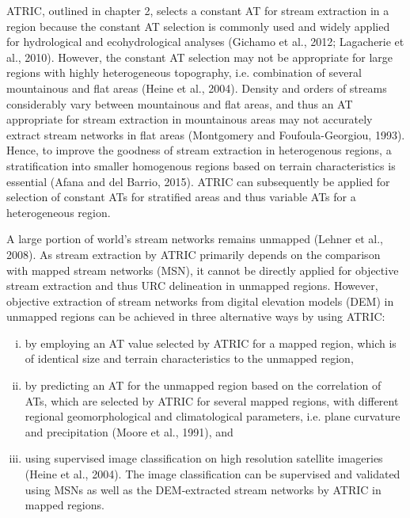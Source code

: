 ATRIC, outlined in chapter 2, selects a constant AT for stream extraction in a region because the constant AT selection is commonly used and widely applied for hydrological and ecohydrological analyses (Gichamo et al., 2012; Lagacherie et al., 2010). However, the constant AT selection may not be appropriate for large regions with highly heterogeneous topography, i.e. combination of several mountainous and flat areas (Heine et al., 2004). Density and orders of streams considerably vary between mountainous and flat areas, and thus an AT appropriate for stream extraction in mountainous areas may not accurately extract stream networks in flat areas (Montgomery and Foufoula-Georgiou, 1993). Hence, to improve the goodness of stream extraction in heterogenous regions, a stratification into smaller homogenous regions based on terrain characteristics is essential (Afana and del Barrio, 2015). ATRIC can subsequently be applied for selection of constant ATs for stratified areas and thus variable ATs for a heterogeneous region.

A large portion of world's stream networks remains unmapped (Lehner et al., 2008). As stream extraction by ATRIC primarily depends on the comparison with mapped stream networks (MSN), it cannot be directly applied for objective stream extraction and thus URC delineation in unmapped regions. However, objective extraction of stream networks from digital elevation models (DEM) in unmapped regions can be achieved in three alternative ways by using ATRIC:

\begin{enumerate}[(i)]

\item by employing an AT value selected by ATRIC for a mapped region, which is of identical size and terrain characteristics to the unmapped region,

\item by predicting an AT for the unmapped region based on the correlation of ATs, which are selected by ATRIC for several mapped regions, with different regional geomorphological and climatological parameters, i.e. plane curvature and precipitation (Moore et al., 1991), and

\item using supervised image classification on high resolution satellite imageries (Heine et al., 2004). The image classification can be supervised and validated using MSNs as well as the DEM-extracted stream networks by ATRIC in mapped regions.

\end{enumerate}


